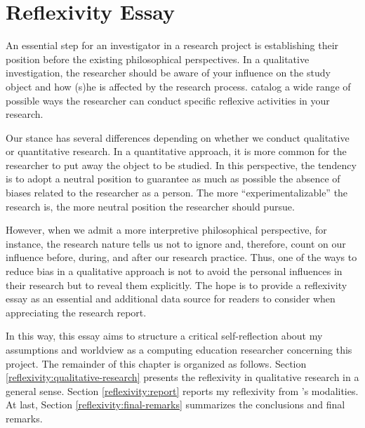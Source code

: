 \chapter{Reflexivity Essay}
\label{chap:reflex-essay}

An essential step for an investigator in a research project is establishing their position before the existing philosophical perspectives. In a qualitative investigation, the researcher should be aware of your influence on the study object and how (s)he is affected by the research process.  catalog a wide range of possible ways the researcher can conduct specific reflexive activities in your research.

Our stance has several differences depending on whether we conduct qualitative or quantitative research. In a quantitative approach, it is more common for the researcher to put away the object to be studied. In this perspective, the tendency is to adopt a neutral position to guarantee as much as possible the absence of biases related to the researcher as a person. The more “experimentalizable” the research is, the more neutral position the researcher should pursue. 

However, when we admit a more interpretive philosophical perspective, for instance, the research nature tells us not to ignore and, therefore, count on our influence before, during, and after our research practice. Thus, one of the ways to reduce bias in a qualitative approach is not to avoid the personal influences in their research but to reveal them explicitly. The hope is to provide a reflexivity essay as an essential and additional data source for readers to consider when appreciating the research report.

In this way, this essay aims to structure a critical self-reflection about my assumptions and worldview as a computing education researcher concerning this project. The remainder of this chapter is organized as follows. Section \ref{reflexivity:qualitative-research} presents the reflexivity in qualitative research in a general sense. Section \ref{reflexivity:report} reports my reflexivity from 's modalities. %
At last, Section \ref{reflexivity:final-remarks} summarizes the conclusions and final remarks.
